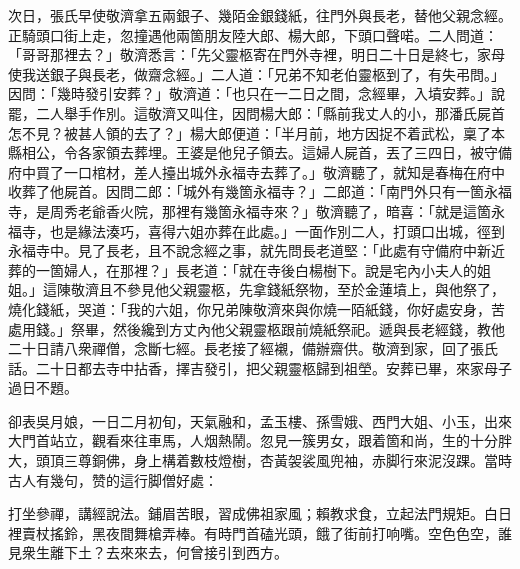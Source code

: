 次日，張氏早使敬濟拿五兩銀子、幾陌金銀錢紙，往門外與長老，替他父親念經。正騎頭口街上走，忽撞遇他兩箇朋友陸大郎、楊大郎，下頭口聲喏。二人問道：「哥哥那裡去？」敬濟悉言：「先父靈柩寄在門外寺裡，明日二十日是終七，家母使我送銀子與長老，做齋念經。」二人道：「兄弟不知老伯靈柩到了，有失弔問。」因問：「幾時發引安葬？」敬濟道：「也只在一二日之間，念經畢，入墳安葬。」說罷，二人舉手作別。這敬濟又叫住，因問楊大郎：「縣前我丈人的小，那潘氏屍首怎不見？被甚人領的去了？」楊大郎便道：「半月前，地方因捉不着武松，稟了本縣相公，令各家領去葬埋。王婆是他兒子領去。這婦人屍首，丟了三四日，被守備府中買了一口棺材，差人擡出城外永福寺去葬了。」敬濟聽了，就知是春梅在府中收葬了他屍首。因問二郎：「城外有幾箇永福寺？」二郎道：「南門外只有一箇永福寺，是周秀老爺香火院，那裡有幾箇永福寺來？」敬濟聽了，暗喜：「就是這箇永福寺，也是緣法湊巧，喜得六姐亦葬在此處。」一面作別二人，打頭口出城，徑到永福寺中。見了長老，且不說念經之事，就先問長老道堅：「此處有守備府中新近葬的一箇婦人，在那裡？」長老道：「就在寺後白楊樹下。說是宅內小夫人的姐姐。」這陳敬濟且不參見他父親靈柩，{}先拿錢紙祭物，至於金蓮墳上，與他祭了，燒化錢紙，哭道：「我的六姐，你兄弟陳敬濟來與你燒一陌紙錢，你好處安身，苦處用錢。」祭畢，然後纔到方丈內他父親靈柩跟前燒紙祭祀。遞與長老經錢，教他二十日請八衆禪僧，念斷七經。長老接了經襯，備辦齋供。敬濟到家，回了張氏話。二十日都去寺中拈香，擇吉發引，把父親靈柩歸到祖塋。安葬已畢，來家母子過日不題。

卻表吳月娘，一日二月初旬，天氣融和，孟玉樓、孫雪娥、西門大姐、小玉，出來大門首站立，觀看來往車馬，人烟熱鬧。忽見一簇男女，跟着箇和尚，生的十分胖大，頭頂三尊銅佛，身上構着數枝燈樹，杏黃袈裟風兜袖，赤脚行來泥沒踝。當時古人有幾句，赞的這行脚僧好處：

\begin{myquote}
打坐參禪，講經說法。鋪眉苦眼，習成佛祖家風；賴教求食，立起法門規矩。白日裡賣杖搖鈴，黑夜間舞槍弄棒。有時門首磕光頭，餓了街前打响嘴。空色色空，誰見衆生離下土？去來來去，何曾接引到西方。
\end{myquote}

